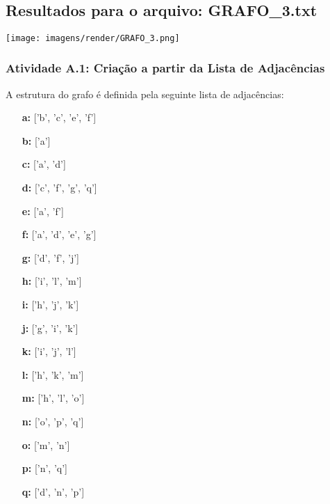 \documentclass[a4paper,12pt]{article}
\begin{document}
\\

\subsection{Resultados para o arquivo: GRAFO\_3.txt}

\begin{center}
    \texttt{[image: imagens/render/GRAFO\_3.png]}
\end{center}

\subsubsection*{Atividade A.1: Criação a partir da Lista de Adjacências}
A estrutura do grafo é definida pela seguinte lista de adjacências:
\begin{itemize}[leftmargin=*]
    \item[\textbf{a:}] ['b', 'c', 'e', 'f'] \item[\textbf{b:}] ['a'] \item[\textbf{c:}] ['a', 'd'] \item[\textbf{d:}] ['c', 'f', 'g', 'q']
    \item[\textbf{e:}] ['a', 'f'] \item[\textbf{f:}] ['a', 'd', 'e', 'g'] \item[\textbf{g:}] ['d', 'f', 'j']
    \item[\textbf{h:}] ['i', 'l', 'm'] \item[\textbf{i:}] ['h', 'j', 'k'] \item[\textbf{j:}] ['g', 'i', 'k']
    \item[\textbf{k:}] ['i', 'j', 'l'] \item[\textbf{l:}] ['h', 'k', 'm'] \item[\textbf{m:}] ['h', 'l', 'o']
    \item[\textbf{n:}] ['o', 'p', 'q'] \item[\textbf{o:}] ['m', 'n'] \item[\textbf{p:}] ['n', 'q'] \item[\textbf{q:}] ['d', 'n', 'p']
\end{itemize}
\end{document}
